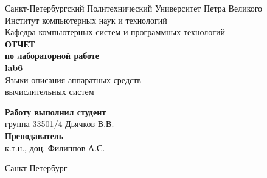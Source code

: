 \begin{titlepage}
\begin{center}
	Санкт-Петербургский Политехнический Университет Петра Великого\\[0.3cm]
	Институт компьютерных наук и технологий \\[0.3cm]
	Кафедра компьютерных систем и программных технологий\\[4cm]
	
	\textbf{ОТЧЕТ}\\ 
	\textbf{по лабораторной работе}\\[0.5cm]
	\textbf{lab6}\\[0.1cm]
	Языки описания аппаратных средств\\ вычислительных систем\\[4.0cm]
\end{center}

\begin{flushright}
	\begin{minipage}{0.45\textwidth}
		\textbf{Работу выполнил студент}\\[3mm]
		группа 33501/4 \hspace*{9mm} Дьячков В.В.\\[5mm]
		\textbf{Преподаватель}\\[5mm]
		\sign[1.5cm] \hspace*{1mm} к.т.н., доц. Филиппов А.С. \\[5mm]
	\end{minipage}
\end{flushright}

\vfill

\begin{center}
	Санкт-Петербург\\
	\the\year
\end{center}
\end{titlepage}

\addtocounter{page}{1}
